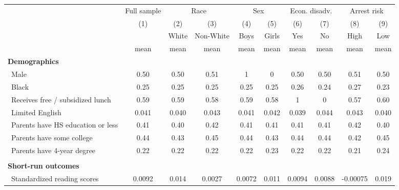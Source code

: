{
\def\sym#1{\ifmmode^{#1}\else\(^{#1}\)\fi}
\begin{tabular}{l*{9}{c}}
\hline\hline
            &\multicolumn{1}{c}{Full sample}&\multicolumn{2}{c}{Race} &\multicolumn{2}{c}{Sex}  &\multicolumn{2}{c}{Econ. disadv.}&\multicolumn{2}{c}{Arrest risk}\\\cmidrule(lr){2-2}\cmidrule(lr){3-4}\cmidrule(lr){5-6}\cmidrule(lr){7-8}\cmidrule(lr){9-10}
            &\multicolumn{1}{c}{(1)}&\multicolumn{1}{c}{(2)}&\multicolumn{1}{c}{(3)}&\multicolumn{1}{c}{(4)}&\multicolumn{1}{c}{(5)}&\multicolumn{1}{c}{(6)}&\multicolumn{1}{c}{(7)}&\multicolumn{1}{c}{(8)}&\multicolumn{1}{c}{(9)}\\
            &\multicolumn{1}{c}{ }&\multicolumn{1}{c}{White}&\multicolumn{1}{c}{Non-White}&\multicolumn{1}{c}{Boys}&\multicolumn{1}{c}{Girls}&\multicolumn{1}{c}{Yes}&\multicolumn{1}{c}{No}&\multicolumn{1}{c}{High}&\multicolumn{1}{c}{Low}\\
            &        mean&        mean&        mean&        mean&        mean&        mean&        mean&        mean&        mean\\
\hline
\textbf{Demographics}\\ \ Male&        0.50&        0.50&        0.51&           1&           0&        0.50&        0.50&        0.51&        0.50\\
\ Black     &        0.25&        0.25&        0.25&        0.25&        0.25&        0.26&        0.24&        0.27&        0.23\\
\ Receives free / subsidized lunch&        0.59&        0.59&        0.58&        0.59&        0.58&           1&           0&        0.57&        0.60\\
\ Limited English&       0.041&       0.040&       0.043&       0.041&       0.042&       0.039&       0.044&       0.043&       0.040\\
\ Parents have HS education or less&        0.41&        0.40&        0.42&        0.41&        0.41&        0.41&        0.41&        0.42&        0.40\\
\ Parents have some college&        0.44&        0.43&        0.45&        0.44&        0.43&        0.44&        0.44&        0.42&        0.45\\
\ Parents have 4-year degree&        0.22&        0.22&        0.22&        0.22&        0.23&        0.22&        0.22&        0.21&        0.24\\
\\ \textbf{Short-run outcomes}\\ \ Standardized reading scores&      0.0092&       0.014&      0.0027&      0.0072&       0.011&      0.0094&      0.0088&    -0.00075&       0.019\\

\end{tabular}}
